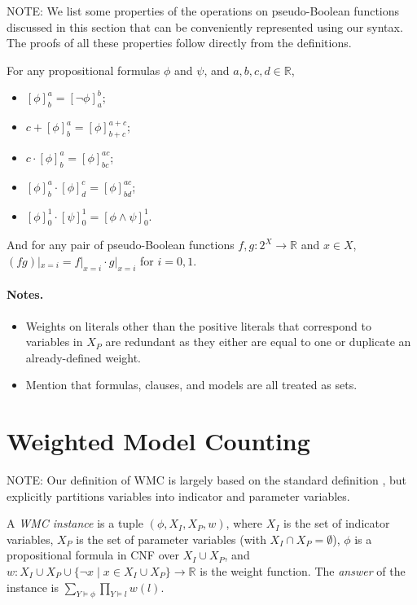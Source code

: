 \documentclass[runningheads]{llncs}
\begin{document}
NOTE: We list some properties of the operations on pseudo-Boolean functions
discussed in this section that can be conveniently represented using our syntax.
The proofs of all these properties follow directly from the definitions.

\begin{proposition} \label{prop:basic}
  For any propositional formulas $\phi$ and $\psi$, and $a, b, c, d \in
  \mathbb{R}$,
  \begin{itemize}
  \item $[\phi]^a_b = [\neg \phi]^b_a$;
  \item $c + [\phi]^a_b = [\phi]^{a+c}_{b+c}$;
  \item $c \cdot [\phi]^a_b = [\phi]^{ac}_{bc}$;
  \item $[\phi]^a_b \cdot [\phi]^c_d = [\phi]^{ac}_{bd}$;
  \item $[\phi]^1_0 \cdot [\psi]_0^1 = [\phi \land \psi]_0^1$.
  \end{itemize}
  And for any pair of pseudo-Boolean functions $f, g \colon 2^X \to \mathbb{R}$
  and $x \in  X$, $(fg)|_{x=i} = f|_{x=i} \cdot g|_{x=i}$ for $i = 0, 1$.
\end{proposition}

\paragraph{Notes.}
\begin{itemize}
\item Weights on literals other than the positive literals that correspond to
  variables in $X_P$ are redundant as they either are equal to one or duplicate
  an already-defined weight.
\item Mention that formulas, clauses, and models are all treated as sets.
\end{itemize}

\section{Weighted Model Counting}

NOTE: Our definition of WMC is largely based on the standard definition
\cite{DBLP:journals/ai/ChaviraD08}, but explicitly partitions variables into
indicator and parameter variables.

\begin{definition}
  A \emph{WMC instance} is a tuple $(\phi, X_I, X_P, w)$, where $X_I$ is
  the set of indicator variables, $X_P$ is the set of parameter variables (with
  $X_I \cap X_P = \emptyset$), $\phi$ is a propositional formula in CNF over
  $X_I \cup X_P$, and $w\colon X_I \cup X_P \cup \{\neg x \mid x \in X_I \cup
  X_P\} \to \mathbb{R}$ is the weight function. The \emph{answer} of the
  instance is $\sum_{Y \models \phi} \prod_{Y \models l} w(l)$.
\end{definition}
\end{document}
